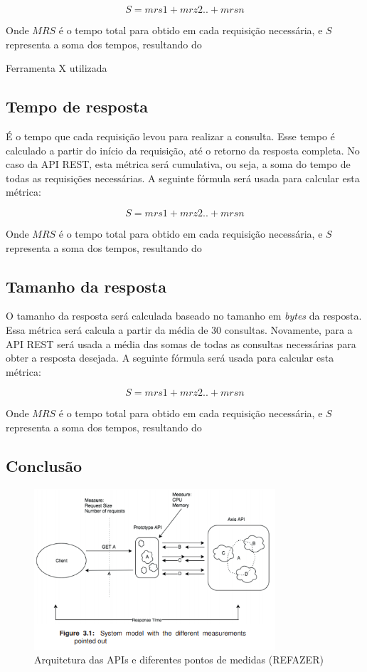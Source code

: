 $$S=mrs1+mrz2..+mrsn$$

Onde $MRS$ é o tempo total para obtido em cada requisição necessária, e $S$ representa a soma dos tempos, resultando do 

Ferramenta X utilizada

\subsection*{Tempo de resposta}

É o tempo que cada requisição levou para realizar a consulta. Esse tempo é calculado a partir do início da requisição, até o retorno da resposta completa. No caso da API REST, esta métrica será cumulativa, ou seja, a soma do tempo de todas as requisições necessárias. A seguinte fórmula será usada para calcular esta métrica: 

$$S=mrs1+mrz2..+mrsn$$

Onde $MRS$ é o tempo total para obtido em cada requisição necessária, e $S$ representa a soma dos tempos, resultando do 

\subsection*{Tamanho da resposta}

O tamanho da resposta será calculada baseado no tamanho em \textit{bytes} da resposta. Essa métrica será calcula a partir da média de 30 consultas. Novamente, para a API REST será usada a média das somas de todas as consultas necessárias para obter a resposta desejada. A seguinte fórmula será usada para calcular esta métrica: 

$$S=mrs1+mrz2..+mrsn$$

Onde $MRS$ é o tempo total para obtido em cada requisição necessária, e $S$ representa a soma dos tempos, resultando do 

\subsection*{Conclusão}

\begin{figure}[htbp]
\centering
\includegraphics[width=0.8\textwidth]{figuras/metricas.PNG}
\caption{Arquitetura das APIs e diferentes pontos de medidas (REFAZER)}
\label{fig:my-metrics}
\author{fonte: Autor}
\end{figure}

